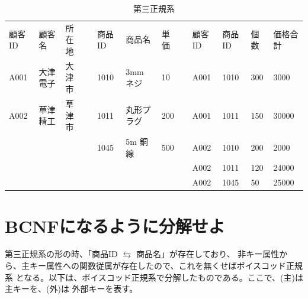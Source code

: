 \documentclass[dvipdfmx,autodetect-engine,titlepage]{jsarticle}
\begin{document}
\begin{table}[h]
  \centering
  \caption{第三正規系}
  \begin{tabular}{llllllll|l|l|l|l|}
  \cline{1-3} \cline{5-7} \cline{9-12}
  \multicolumn{1}{|l|}{顧客ID} & \multicolumn{1}{l|}{顧客名}  & \multicolumn{1}{l|}{所在地} & \multicolumn{1}{l|}{} & \multicolumn{1}{l|}{商品ID} & \multicolumn{1}{l|}{商品名}    & \multicolumn{1}{l|}{単価}  &  & 顧客ID & 商品ID & 個数  & 価格合計  \\ \cline{1-3} \cline{5-7} \cline{9-12} 
  \multicolumn{1}{|l|}{A001} & \multicolumn{1}{l|}{大津電子} & \multicolumn{1}{l|}{大津市} & \multicolumn{1}{l|}{} & \multicolumn{1}{l|}{1010} & \multicolumn{1}{l|}{3mm ネジ} & \multicolumn{1}{l|}{10}  &  & A001 & 1010 & 300 & 3000  \\ \cline{1-3} \cline{5-7} \cline{9-12} 
  \multicolumn{1}{|l|}{A002} & \multicolumn{1}{l|}{草津精工} & \multicolumn{1}{l|}{草津市} & \multicolumn{1}{l|}{} & \multicolumn{1}{l|}{1011} & \multicolumn{1}{l|}{丸形プラグ}  & \multicolumn{1}{l|}{200} &  & A001 & 1011 & 150 & 30000 \\ \cline{1-3} \cline{5-7} \cline{9-12} 
                             &                           &                          & \multicolumn{1}{l|}{} & \multicolumn{1}{l|}{1045} & \multicolumn{1}{l|}{5m 銅線}  & \multicolumn{1}{l|}{500} &  & A002 & 1010 & 200 & 2000  \\ \cline{5-7} \cline{9-12} 
                             &                           &                          &                       &                           &                             &                          &  & A002 & 1011 & 120 & 24000 \\ \cline{9-12} 
                             &                           &                          &                       &                           &                             &                          &  & A002 & 1045 & 50  & 25000 \\ \cline{9-12} 
  \end{tabular}
  \end{table}

\section{BCNFになるように分解せよ}

第三正規系の形の時、「商品ID \begin{math}\leftrightarrows \end{math} 商品名」が存在しており、
非キー属性から、主キー属性への関数従属が存在したので、これを無くせばボイスコッド正規系
となる。以下は、ボイスコッド正規系で分解したものである。ここで、(主)は主キーを、(外)は
外部キーを表す。
\end{document}
